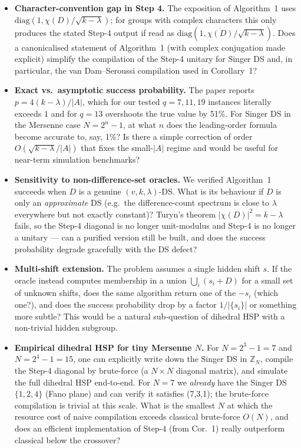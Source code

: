 \documentclass[11pt]{article}
\begin{document}
\begin{itemize}
\item[Q1.] \textbf{Character-convention gap in Step 4.}  The exposition
of Algorithm~1 uses $\mathrm{diag}(1,\chi(D)/\sqrt{k-\lambda})$; for
groups with complex characters this only produces the stated Step-4
output if read as $\mathrm{diag}(1,\overline{\chi(D)}/\sqrt{k-\lambda})$.
Does a canonicalised statement of Algorithm~1 (with complex conjugation
made explicit) simplify the compilation of the Step-4 unitary for
Singer DS and, in particular, the van Dam--Seroussi compilation used in
Corollary~1?

\item[Q2.] \textbf{Exact vs.\ asymptotic success probability.}  The
paper reports $p = 4(k-\lambda)/|A|$, which for our tested $q=7,11,19$
instances literally exceeds $1$ and for $q=13$ overshoots the true
value by 51\%.  For Singer DS in the Mersenne case $N=2^n-1$, at what
$n$ does the leading-order formula become accurate to, say, 1\%?  Is
there a simple correction of order $O(\sqrt{k-\lambda}/|A|)$ that fixes
the small-$|A|$ regime and would be useful for near-term simulation
benchmarks?

\item[Q3.] \textbf{Sensitivity to non-difference-set oracles.}  We
verified Algorithm~1 succeeds when $D$ is a genuine
$(v,k,\lambda)$-DS.  What is its behaviour if $D$ is only an
\emph{approximate} DS (e.g.\ the difference-count spectrum is close to
$\lambda$ everywhere but not exactly constant)?  Turyn's theorem
$|\chi(D)|^2 = k-\lambda$ fails, so the Step-4 diagonal is no longer
unit-modulus and Step-4 is no longer a unitary --- can a purified
version still be built, and does the success probability degrade
gracefully with the DS defect?

\item[Q4.] \textbf{Multi-shift extension.}  The problem assumes a single
hidden shift $s$.  If the oracle instead computes membership in a
union $\bigcup_i (s_i + D)$ for a small set of unknown shifts, does the
same algorithm return one of the $-s_i$ (which one?), and does the
success probability drop by a factor $1/|\{s_i\}|$ or something more
subtle?  This would be a natural sub-question of dihedral HSP with a
non-trivial hidden subgroup.

\item[Q5.] \textbf{Empirical dihedral HSP for tiny Mersenne $N$.}  For
$N = 2^3 - 1 = 7$ and $N = 2^4 - 1 = 15$, one can explicitly write down
the Singer DS in $\mathbb{Z}_N$, compile the Step-4 diagonal by
brute-force (a $N\times N$ diagonal matrix), and simulate the full
dihedral HSP end-to-end.  For $N=7$ we \emph{already} have the Singer
DS $\{1, 2, 4\}$ (Fano plane) and can verify it satisfies (7,3,1); the
brute-force compilation is trivial at this scale.  What is the smallest
$N$ at which the resource cost of naive compilation exceeds classical
brute-force $O(N)$, and does an efficient implementation of Step-4
(from Cor.~1) really outperform classical below the crossover?
\end{itemize}
\end{document}
